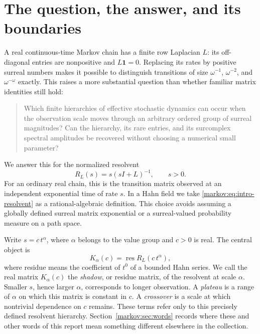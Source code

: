 \documentclass[11pt]{article}
\numberwithin{equation}{section}
\theoremstyle{definition}
\theoremstyle{remark}
\newcommand{\one}{\mathbf 1}
\newcommand{\res}{\operatorname{res}}
\begin{document}
\clearpage
\begingroup
\small
\setlength{\parskip}{0pt}
\enlargethispage{3\baselineskip}
\tableofcontents
\endgroup
\clearpage

\section{The question, the answer, and its boundaries}\label{markov:sec:intro}

A real continuous-time Markov chain has a finite row Laplacian $L$: its
off-diagonal entries are nonpositive and $L\one=0$. Replacing its rates by positive
surreal numbers makes it possible to distinguish transitions of size
$\omega^{-1}$, $\omega^{-2}$, and $\omega^{-\omega}$ exactly. This raises a more
substantial question than whether familiar matrix identities still hold:
\begin{quote}
Which finite hierarchies of effective stochastic dynamics can occur when the
observation scale moves through an arbitrary ordered group of surreal magnitudes?
Can the hierarchy, its rare entries, and its surcomplex spectral amplitudes be
recovered without choosing a numerical small parameter?
\end{quote}
We answer this for the normalized resolvent
\begin{equation}\label{markov:eq:intro-resolvent}
 R_L(s)=s(sI+L)^{-1},\qquad s>0.
\end{equation}
For an ordinary real chain, this is the transition matrix observed at an
independent exponential time of rate $s$. In a Hahn field we take
\eqref{markov:eq:intro-resolvent} as a rational-algebraic definition. This choice avoids
assuming a globally defined surreal matrix exponential or a surreal-valued
probability measure on a path space.

Write $s=c\,t^\alpha$, where $\alpha$ belongs to the value group and $c>0$ is real.
The central object is
\[
 K_\alpha(c)=\res R_L(c\,t^\alpha),
\]
where residue means the coefficient of $t^0$ of a bounded Hahn series. We call
the real matrix $K_\alpha(c)$ the \emph{shadow}, or residue matrix, of the
resolvent at scale $\alpha$. Smaller
$s$, hence larger $\alpha$, corresponds to longer observation. A \emph{plateau}
is a range of $\alpha$ on which this matrix is constant in $c$. A
\emph{crossover} is a scale at which nontrivial dependence on $c$ remains.
These terms refer only to this precisely defined resolvent hierarchy.
Section~\ref{markov:sec:words} records where these and other words of this
report mean something different elsewhere in the collection.
\end{document}
